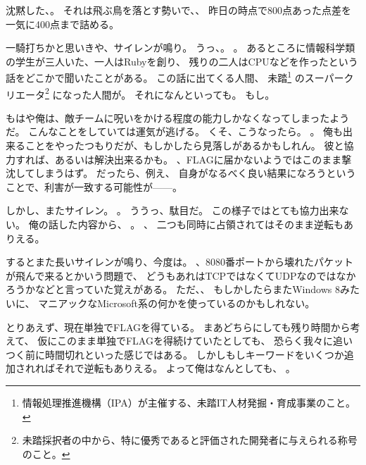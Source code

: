 沈黙した、。
それは飛ぶ鳥を落とす勢いで、、
昨日の時点で800点あった点差を一気に400点まで詰める。

一騎打ちかと思いきや、サイレンが鳴り。
うっ、。
。
あるところに情報科学類の学生が三人いた、一人はRubyを創り、
残りの二人はCPUなどを作ったという話をどこかで聞いたことがある。
この話に出てくる人間、
未踏\footnote{情報処理推進機構（IPA）が主催する、未踏IT人材発掘・育成事業のこと。}%
のスーパークリエータ\footnote{未踏採択者の中から、特に優秀であると評価された開発者に与えられる称号のこと。}%
になった人間が。
それになんといっても。
もし。

もはや俺は、敵チームに呪いをかける程度の能力しかなくなってしまったようだ。
こんなことをしていては運気が逃げる。
くそ、こうなったら。
。
俺も出来ることをやったつもりだが、もしかしたら見落しがあるかもしれん。
彼と協力すれば、あるいは解決出来るかも。
、FLAGに届かないようではこのまま撃沈してしまうはず。
だったら、例え、
自身がなるべく良い結果になろうということで、利害が一致する可能性が------。

しかし、またサイレン。
。
ううっ、駄目だ。
この様子ではとても協力出来ない。
俺の話した内容から、
。
、
二つも同時に占領されてはそのまま逆転もありえる。

するとまた長いサイレンが鳴り、今度は。
、8080番ポートから壊れたパケットが飛んで来るとかいう問題で、
どうもあれはTCPではなくてUDPなのではなかろうかなどと言っていた覚えがある。
ただ、、
もしかしたらまたWindows 8みたいに、
マニアックなMicrosoft系の何かを使っているのかもしれない。

とりあえず、現在単独でFLAGを得ている。
まあどちらにしても残り時間から考えて、
仮にこのまま単独でFLAGを得続けていたとしても、
恐らく我々に追いつく前に時間切れといった感じではある。
しかしもしキーワードをいくつか追加されればそれで逆転もありえる。
よって俺はなんとしても、
。

